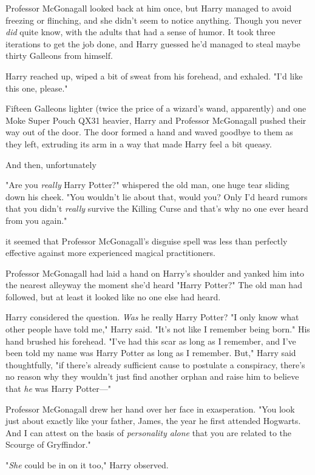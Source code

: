 Professor McGonagall looked back at him once, but Harry managed to avoid
freezing or flinching, and she didn't seem to notice anything. Though you never
\emph{did} quite know, with the adults that had a sense of humor. It took
three iterations to get the job done, and Harry guessed he'd managed to steal
maybe thirty Galleons from himself.

Harry reached up, wiped a bit of sweat from his forehead, and exhaled. "I'd
like this one, please."

Fifteen Galleons lighter (twice the price of a wizard's wand, apparently) and
one Moke Super Pouch QX31 heavier, Harry and Professor McGonagall pushed their
way out of the door. The door formed a hand and waved goodbye to them as they
left, extruding its arm in a way that made Harry feel a bit queasy.

And then, unfortunately{\el}

"Are you \emph{really} Harry Potter?" whispered the old man, one huge tear
sliding down his cheek. "You wouldn't lie about that, would you? Only I'd heard
rumors that you didn't \emph{really} survive the Killing Curse and that's why
no one ever heard from you again."

{\el} it seemed that Professor McGonagall's disguise spell was less than
perfectly effective against more experienced magical practitioners.

Professor McGonagall had laid a hand on Harry's shoulder and yanked him into
the nearest alleyway the moment she'd heard "Harry Potter?" The old man had
followed, but at least it looked like no one else had heard.

Harry considered the question. \emph{Was} he really Harry Potter? "I only know
what other people have told me," Harry said. "It's not like I remember being
born." His hand brushed his forehead. "I've had this scar as long as I
remember, and I've been told my name was Harry Potter as long as I remember.
But," Harry said thoughtfully, "if there's already sufficient cause to
postulate a conspiracy, there's no reason why they wouldn't just find another
orphan and raise him to believe that \emph{he} was Harry Potter\mbox{---}"

Professor McGonagall drew her hand over her face in exasperation. "You look
just about exactly like your father, James, the year he first attended
Hogwarts. And I can attest on the basis of \emph{personality alone} that you
are related to the Scourge of \mbox{Gryffindor}."

"\emph{She} could be in on it too," Harry observed.


